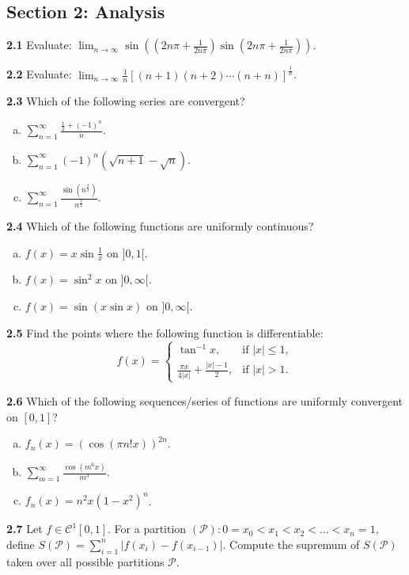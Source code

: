 \documentclass[11pt,a4paper]{article}
\newcommand{\examsec}[1]{%
  \subsection*{#1}
  \vspace{-2pt}
}
\newcommand{\qitem}[1]{\par\medskip\noindent\textbf{#1}\hspace{0.5em}}
\begin{document}
\examsec{Section 2: Analysis}

\qitem{2.1} Evaluate: $\displaystyle\lim_{n \to \infty} \sin\left(\left(2n\pi + \frac{1}{2n\pi}\right)\sin\left(2n\pi + \frac{1}{2n\pi}\right)\right)$.

\qitem{2.2} Evaluate: $\displaystyle\lim_{n \to \infty} \frac{1}{n}\left[(n+1)(n+2)\cdots(n+n)\right]^{\frac{1}{n}}$.

\qitem{2.3} Which of the following series are convergent?
\begin{enumerate}[a.]
  \item $\displaystyle\sum_{n=1}^{\infty} \frac{\frac{1}{2} + (-1)^n}{n}$.
  \item $\displaystyle\sum_{n=1}^{\infty} (-1)^n(\sqrt{n+1} - \sqrt{n})$.
  \item $\displaystyle\sum_{n=1}^{\infty} \frac{\sin(n^{\frac{3}{2}})}{n^{\frac{3}{2}}}$.
\end{enumerate}

\qitem{2.4} Which of the following functions are uniformly continuous?
\begin{enumerate}[a.]
  \item $f(x) = x\sin\frac{1}{x}$ on $]0, 1[$.
  \item $f(x) = \sin^2 x$ on $]0, \infty[$.
  \item $f(x) = \sin(x\sin x)$ on $]0, \infty[$.
\end{enumerate}

\qitem{2.5} Find the points where the following function is differentiable:
\[
  f(x) = \begin{cases} \tan^{-1} x, & \text{if } |x| \le 1, \\ \frac{\pi x}{4|x|} + \frac{|x|-1}{2}, & \text{if } |x| > 1. \end{cases}
\]

\qitem{2.6} Which of the following sequences/series of functions are uniformly convergent on $[0, 1]$?
\begin{enumerate}[a.]
  \item $f_n(x) = (\cos(\pi n! x))^{2n}$.
  \item $\displaystyle\sum_{m=1}^{\infty} \frac{\cos(m^6 x)}{m^3}$.
  \item $f_n(x) = n^2 x(1 - x^2)^n$.
\end{enumerate}

\qitem{2.7} Let $f \in \mathcal{C}^1[0, 1]$. For a partition $(\mathcal{P}) : 0 = x_0 < x_1 < x_2 < \dots < x_n = 1$, define $S(\mathcal{P}) = \sum_{i=1}^{n} |f(x_i) - f(x_{i-1})|$. Compute the supremum of $S(\mathcal{P})$ taken over all possible partitions $\mathcal{P}$.
\end{document}
